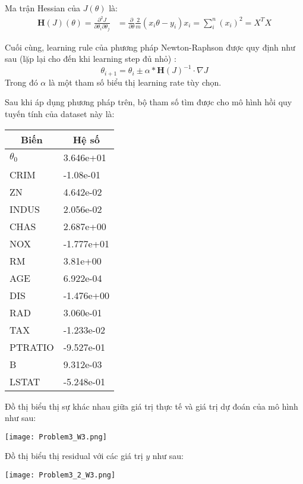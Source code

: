 \documentclass[a4paper, 12pt]{article}  %
\begin{document}
Ma trận Hessian của $J(\theta)$ là:
\begin{align*}
    \mathbf{H}(J)(\theta) = \frac{\partial^2 J}{\partial \theta_i \partial \theta_j} &= \frac{\partial}{\partial \theta} \frac{2}{m} (x_i \theta - y_i) x_i  = \sum_i^n (x_i)^2 = X^TX
\end{align*}

Cuối cùng, learning rule của phương pháp Newton-Raphson được quy định như sau (lặp lại cho đến khi learning step đủ nhỏ) :
\[\theta_{i+1} = \theta_{i} \pm \alpha * \mathbf{H}(J)^{-1} \cdot \nabla J\]
Trong đó $\alpha$ là một tham số biểu thị learning rate tùy chọn.

Sau khi áp dụng phương pháp trên, bộ tham số tìm được cho mô hình hồi quy tuyến tính của dataset này là:

\begin{center}
 \begin{tabular}{ll}
\multicolumn{1}{c}{Biến} & \multicolumn{1}{c}{Hệ số} \\ \hline
$\theta_0$     &  3.646e+01\\
CRIM     &  -1.08e-01\\ 
ZN    &  4.642e-02\\
INDUS    &   2.056e-02\\
CHAS     &    2.687e+00\\
NOX     &    -1.777e+01\\
RM    &    3.81e+00\\
AGE    &    6.922e-04\\
DIS    &    -1.476e+00\\
RAD    &    3.060e-01\\
TAX  &    -1.233e-02 \\
PTRATIO   &   -9.527e-01\\
B    &  9.312e-03\\
LSTAT    & -5.248e-01\\
\end{tabular}  
\end{center}

Đồ thị biểu thị sự khác nhau giữa giá trị thực tế và giá trị dự đoán của mô hình như sau:
\begin{center}
    \texttt{[image: Problem3\_W3.png]}
\end{center}
 Đồ thị biểu thị residual với các giá trị $y$ như sau:
 \begin{center}
 \texttt{[image: Problem3\_2\_W3.png]}
 \end{center}


\end{document}
